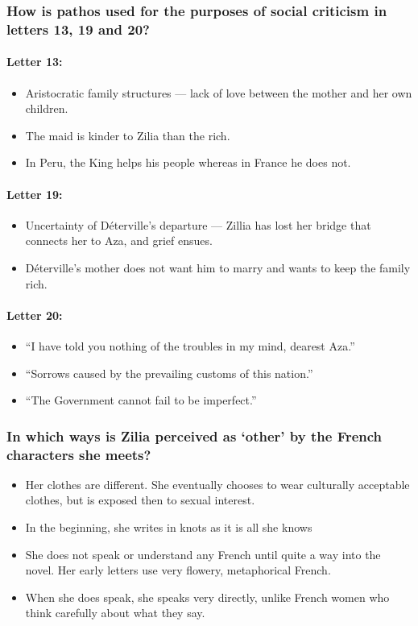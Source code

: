 \documentclass[12pt]{article}
\begin{document}
\subsubsection*{How is pathos used for the purposes of social criticism in letters 13, 19 and 20?}

\paragraph{Letter 13:}
\begin{itemize}
  \item{Aristocratic family structures --- lack of love between the mother and her own children.}
  \item{The maid is kinder to Zilia than the rich.}
  \item{In Peru, the King helps his people whereas in France he does not.}
\end{itemize}

\paragraph{Letter 19:}
\begin{itemize}
  \item{Uncertainty of Déterville's departure --- Zillia has lost her bridge that connects her to Aza, and grief ensues.}
  \item{Déterville's mother does not want him to marry and wants to keep the family rich.}
\end{itemize}

\paragraph{Letter 20:}
\begin{itemize}
  \item{``I have told you nothing of the troubles in my mind, dearest Aza.''}
  \item{``Sorrows caused by the prevailing customs of this nation.''}
  \item{``The Government cannot fail to be imperfect.''}
\end{itemize}

\subsubsection*{In which ways is Zilia perceived as `other' by the French characters she meets?}

\begin{itemize}
  \item{Her clothes are different. She eventually chooses to wear culturally acceptable clothes, but is exposed then to sexual interest.}
  \item{In the beginning, she writes in knots as it is all she knows}
  \item{She does not speak or understand any French until quite a way into the novel. Her early letters use very flowery, metaphorical French.}
  \item{When she does speak, she speaks very directly, unlike French women who think carefully about what they say.}
\end{itemize}
\end{document}
